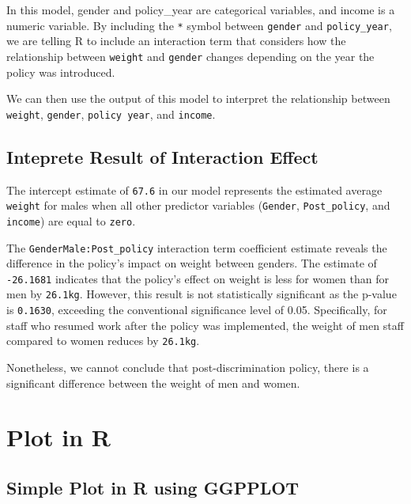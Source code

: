 \documentclass[
]{article}
\begin{document}
In this model, gender and policy\_year are categorical variables, and
income is a numeric variable. By including the \texttt{*} symbol between
\texttt{gender} and \texttt{policy\_year}, we are telling R to include
an interaction term that considers how the relationship between
\texttt{weight} and \texttt{gender} changes depending on the year the
policy was introduced.

We can then use the output of this model to interpret the relationship
between \texttt{weight}, \texttt{gender}, \texttt{policy\ year}, and
\texttt{income}.

\hypertarget{inteprete-result-of-interaction-effect}{%
\subsection{Inteprete Result of Interaction
Effect}\label{inteprete-result-of-interaction-effect}}

The intercept estimate of \texttt{67.6} in our model represents the
estimated average \texttt{weight} for males when all other predictor
variables (\texttt{Gender}, \texttt{Post\_policy}, and \texttt{income})
are equal to \texttt{zero}.

The \texttt{GenderMale:Post\_policy} interaction term coefficient
estimate reveals the difference in the policy's impact on weight between
genders. The estimate of \texttt{-26.1681} indicates that the policy's
effect on weight is less for women than for men by \texttt{26.1kg}.
However, this result is not statistically significant as the p-value is
\texttt{0.1630}, exceeding the conventional significance level of 0.05.
Specifically, for staff who resumed work after the policy was
implemented, the weight of men staff compared to women reduces by
\texttt{26.1kg}.

Nonetheless, we cannot conclude that post-discrimination policy, there
is a significant difference between the weight of men and women.

\hypertarget{plot-in-r}{%
\section{Plot in R}\label{plot-in-r}}

\hypertarget{simple-plot-in-r-using-ggpplot}{%
\subsection{Simple Plot in R using
GGPPLOT}\label{simple-plot-in-r-using-ggpplot}}
\end{document}
